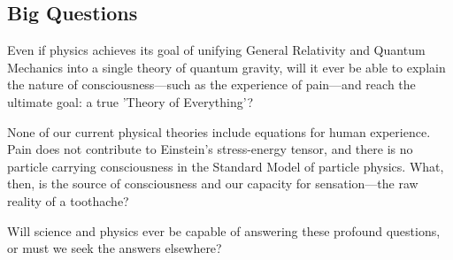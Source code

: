 \subsection*{Big Questions}

Even if physics achieves its goal of unifying General Relativity and Quantum Mechanics into a single theory of quantum gravity, will it ever be able to explain the nature of consciousness—such as the experience of pain—and reach the ultimate goal: a true 'Theory of Everything'?

None of our current physical theories include equations for human experience. Pain does not contribute to Einstein’s stress-energy tensor, and there is no particle carrying consciousness in the Standard Model of particle physics. What, then, is the source of consciousness and our capacity for sensation—the raw reality of a toothache?

Will science and physics ever be capable of answering these profound questions, or must we seek the answers elsewhere?
